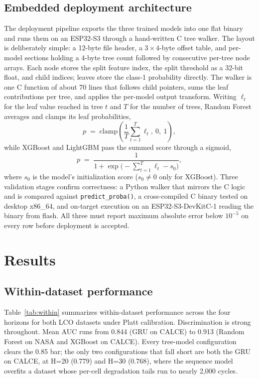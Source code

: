 \documentclass[journal]{IEEEtran}
\begin{document}
\subsection{Embedded deployment architecture}
The deployment pipeline exports the three trained models into one flat binary and runs them on an ESP32-S3 through a hand-written C tree walker. The layout is deliberately simple: a 12-byte file header, a $3{\times}4$-byte offset table, and per-model sections holding a 4-byte tree count followed by consecutive per-tree node arrays. Each node stores the split feature index, the split threshold as a 32-bit float, and child indices; leaves store the class-1 probability directly. The walker is one C function of about 70 lines that follows child pointers, sums the leaf contributions per tree, and applies the per-model output transform. Writing $\ell_t$ for the leaf value reached in tree $t$ and $T$ for the number of trees, Random Forest averages and clamps its leaf probabilities,
\begin{equation}\label{eq:rf}
p \;=\; \mathrm{clamp}\!\left(\frac{1}{T}\sum_{t=1}^{T}\ell_t,\ 0,\ 1\right),
\end{equation}
while XGBoost and LightGBM pass the summed score through a sigmoid,
\begin{equation}\label{eq:sigmoid}
p \;=\; \frac{1}{1+\exp\!\bigl(-\textstyle\sum_{t=1}^{T}\ell_t - s_0\bigr)},
\end{equation}
where $s_0$ is the model's initialization score ($s_0\neq 0$ only for XGBoost). Three validation stages confirm correctness: a Python walker that mirrors the C logic and is compared against \texttt{predict\_proba()}, a cross-compiled C binary tested on desktop x86\_64, and on-target execution on an ESP32-S3-DevKitC-1 reading the binary from flash. All three must report maximum absolute error below $10^{-5}$ on every row before deployment is accepted.



\section{Results}

\subsection{Within-dataset performance}
Table~\ref{tab:within} summarizes within-dataset performance across the four horizons for both LCO datasets under Platt calibration. Discrimination is strong throughout. Mean AUC runs from 0.844 (GRU on CALCE) to 0.913 (Random Forest on NASA and XGBoost on CALCE). Every tree-model configuration clears the 0.85 bar; the only two configurations that fall short are both the GRU on CALCE, at H=20 (0.779) and H=30 (0.768), where the sequence model overfits a dataset whose per-cell degradation tails run to nearly 2,000 cycles.
\end{document}
